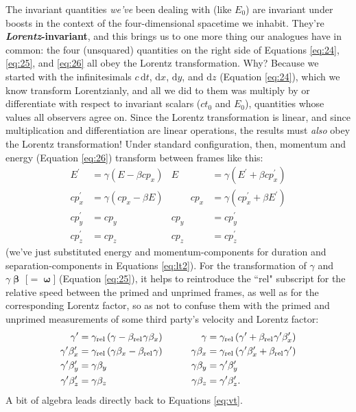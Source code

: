 \documentclass[12pt]{article}
\newcommand{\dd}[1]{\mathrm{d}#1}
\newcommand{\vvbeta}{\bm{\upbeta}}
\newcommand{\vvomega}{\bm{\upomega}}
\begin{document}
The invariant quantities \emph{we've} been dealing with (like $E_0$) are invariant under boosts in the context of the four-dimensional spacetime we inhabit. They're \textbf{\emph{Lorentz}-invariant}, and this brings us to one more thing our analogues have in common: the four (unsquared) quantities on the right side of Equations \ref{eq:24}, \ref{eq:25}, and \ref{eq:26} all obey the Lorentz transformation. Why? Because we started with the infinitesimals $c\, \dd t$, $\dd x$, $\dd y$, and $\dd z$ (Equation \ref{eq:24}), which we know transform Lorentzianly, and all we did to them was multiply by or differentiate with respect to invariant scalars ($ct_0$ and $E_0$), quantities whose values all observers agree on. Since the Lorentz transformation is linear, and since multiplication and differentiation are linear operations, the results must \emph{also} obey the Lorentz transformation! Under standard configuration, then, momentum and energy (Equation \ref{eq:26}) transform between frames like this:
\begin{equation}\label{eq:fm}
\begin{aligned}
E^\prime &= \gamma \left( E - \beta cp_x \right) & E &= \gamma \left( E^\prime + \beta cp_x^\prime \right) \\
cp_x^\prime &= \gamma \left( cp_x - \beta E \right) & \qquad cp_x &= \gamma \left( cp_x^\prime + \beta E^\prime \right) \\
cp_y^\prime &=cp_y & cp_y &= cp_y^\prime \\
cp_z^\prime &=cp_z & cp_z &= cp_z^\prime
\end{aligned}
\end{equation}
(we've just substituted energy and momentum-components for duration and separation-components in Equations \ref{eq:lt2}). For the transformation of $\gamma$ and $\gamma \vvbeta$ [$= \vvomega$] (Equation \ref{eq:25}), it helps to reintroduce the ``rel" subscript for the relative speed between the primed and unprimed frames, as well as for the corresponding Lorentz factor, so as not to confuse them with the primed and unprimed measurements of some third party's velocity and Lorentz factor: 
\begin{equation}\label{eq:fv}
\begin{aligned}
\gamma^\prime &= \gamma_{\textrm{rel}} \left( \gamma - \beta_{\textrm{rel}} \mkern1mu \gamma \beta_x \right) & \gamma &= \gamma_{\textrm{rel}} \left( \gamma^\prime + \beta_{\textrm{rel}} \mkern1mu \gamma^\prime \beta_x^\prime \right) \\
\gamma^\prime \beta_x^\prime &= \gamma_{\textrm{rel}} \left( \gamma \beta_x - \beta_{\textrm{rel}} \mkern1mu \gamma \right) & \qquad \gamma \beta_x &= \gamma_{\textrm{rel}} \left( \gamma^\prime \beta_x^\prime + \beta_{\textrm{rel}} \mkern1mu \gamma^\prime \right) \\
\gamma^\prime \beta_y^\prime &= \gamma \beta_y & \gamma \beta_y &= \gamma^\prime \beta_y^\prime \\
\gamma^\prime \beta_z^\prime &= \gamma \beta_z & \gamma \beta_z &= \gamma^\prime \beta_z^\prime.
\end{aligned}
\end{equation}
A bit of algebra leads directly back to Equations \ref{eq:vt}.
\end{document}

